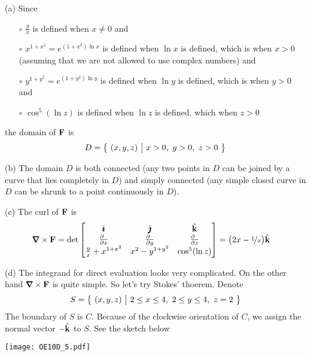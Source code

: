 \begin{solution}
(a)
Since 
\begin{itemize}\itemsep1pt \parskip0pt  %
\item[$\circ$]
$\frac{y}{x}$ is defined when $x\ne 0$ and
\item[$\circ$]
$x^{1+x^2}=e^{(1+x^2)\ln x}$ is defined when $\ln x$ is defined, 
which is when $x>0$ (assuming that we are not allowed to use complex numbers)
and
\item[$\circ$]
$y^{1+y^2}=e^{(1+y^2)\ln y}$ is defined when $\ln y$ is defined, 
which is when $y>0$ and
\item[$\circ$]
$\cos^5(\ln z)$ is defined when $\ln z$ is defined, 
which when $z>0$
\end{itemize}
the domain of $\mathbf{F}$ is
\begin{equation*}
D=\Set{(x,y,z)}{x>0,\ y>0,\ z>0}
\end{equation*}

\noindent (b) The domain $D$ is both connected (any two points in $D$
can be joined by a curve that lies completely in $D$) and 
simply connected (any simple closed curve in $D$ can be shrunk to a 
point continuously in $D$).


\noindent (c) The curl of $\mathbf{F}$ is 
\begin{align*}
\vnabla\times\vF
&=\det\left[\begin{matrix}
\hi &\hj &\hk \\
\tfrac{\partial\hfill}{\partial x} & \tfrac{\partial\hfill}{\partial y} & 
                \tfrac{\partial\hfill}{\partial z} \\
\frac{y}{x} +x^{1+x^2} & x^2-y^{1+y^2} & \cos^5(\ln z)
\end{matrix}
\right]
=\big(2x-\nicefrac{1}{x}\big)\hk
\end{align*}

\noindent (d) 
The integrand for direct evaluation looks very complicated.
On the other hand $\vnabla\times\vF$ is quite simple. So let's
try Stokes' thoerem.
Denote 
\begin{equation*}
S=\Set{(x,y,z)}{2\le x\le 4,\ 2\le y\le 4,\ z=2}
\end{equation*}
The boundary of $S$ is $C$. Because of the clockwise orientation
of $C$, we assign the normal vector $-\hat{\mathbf{k}}$ to $S$. See the sketch below

\begin{center}
       \texttt{[image: OE10D\_5.pdf]}
\end{center}



\end{solution}
